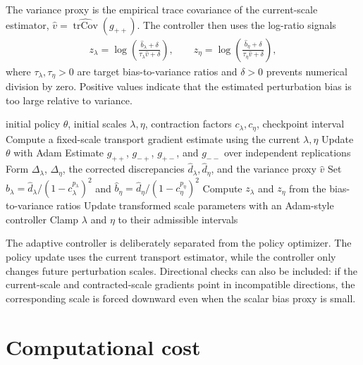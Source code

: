 The variance proxy is the empirical trace covariance of the current-scale estimator, $\widehat v = \widehat{\operatorname{trCov}}(g_{++})$.
The controller then uses the log-ratio signals
\begin{align}
    z_\lambda
    =
    \log
    \left(
        \frac{\widehat b_\lambda+\delta}
        {\tau_\lambda \widehat v+\delta}
    \right),
    \qquad
    z_\eta
    =
    \log
    \left(
        \frac{\widehat b_\eta+\delta}
        {\tau_\eta \widehat v+\delta}
    \right),
\end{align}
where $\tau_\lambda,\tau_\eta>0$ are target bias-to-variance ratios and $\delta>0$ prevents numerical division by zero. Positive values indicate that the estimated perturbation bias is too large relative to variance.

\begin{algorithm}[H]
\caption{Adaptive transport}
\label{alg:adaptive-transport}
\begin{algorithmic}[1]
\Require initial policy $\theta$, initial scales $\lambda,\eta$, contraction factors $c_\lambda,c_\eta$, checkpoint interval
    \State Compute a fixed-scale transport gradient estimate using the current $\lambda,\eta$
    \State Update $\theta$ with Adam
        \State Estimate $g_{++}$, $g_{-+}$, $g_{+-}$, and $g_{--}$ over independent replications
        \State Form $\Delta_\lambda$, $\Delta_\eta$, the corrected discrepancies $\widehat d_\lambda,\widehat d_\eta$, and the variance proxy $\widehat v$
        \State Set $\widehat b_\lambda=\widehat d_\lambda/(1-c_\lambda^{p_\lambda})^2$ and $\widehat b_\eta=\widehat d_\eta/(1-c_\eta^{p_\eta})^2$
        \State Compute $z_\lambda$ and $z_\eta$ from the bias-to-variance ratios
        \State Update transformed scale parameters with an Adam-style controller
        \State Clamp $\lambda$ and $\eta$ to their admissible intervals
    \EndIf
\EndFor
\end{algorithmic}
\end{algorithm}

The adaptive controller is deliberately separated from the policy optimizer. The policy update uses the current transport estimator, while the controller only changes future perturbation scales. Directional checks can also be included: if the current-scale and contracted-scale gradients point in incompatible directions, the corresponding scale is forced downward even when the scalar bias proxy is small.

\section{Computational cost}

